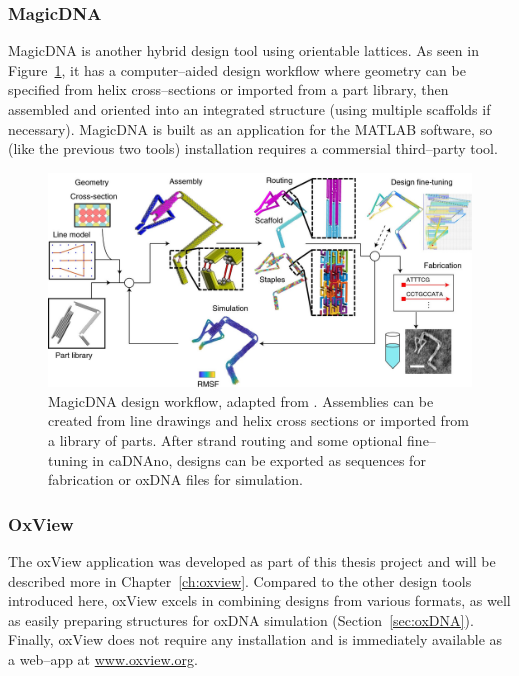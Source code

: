 \subsubsection{MagicDNA}
MagicDNA \cite{huang2021integrated} is another hybrid design tool using orientable lattices. As seen in Figure~\ref{fig:magicDNA}, it has a computer--aided design workflow where geometry can be specified from helix cross--sections or imported from a part library, then assembled and oriented into an integrated structure (using multiple scaffolds if necessary). MagicDNA is built as an application for the MATLAB software, so (like the previous two tools) installation requires a commersial third--party tool.


\begin{figure}[ht]
  \begin{center}
    \includegraphics[width=\textwidth]{figures/magicDNA.jpeg}
    \caption{MagicDNA design workflow, adapted from \cite{huang2021integrated}. Assemblies can be created from line drawings and helix cross sections or imported from a library of parts. After strand routing and some optional fine--tuning in caDNAno, designs can be exported as sequences for fabrication or oxDNA files for simulation.}
    \label{fig:magicDNA}
  \end{center}
\end{figure}

\subsubsection{OxView}
The oxView application \cite{poppleton2020design, bohlin2022oxview} was developed as part of this thesis project and will be described more in Chapter~\ref{ch:oxview}. Compared to the other design tools introduced here, oxView excels in combining designs from various formats, as well as easily preparing structures for oxDNA simulation (Section~\ref{sec:oxDNA}). Finally, oxView does not require any installation and is immediately available as a web--app at \url{www.oxview.org}.

